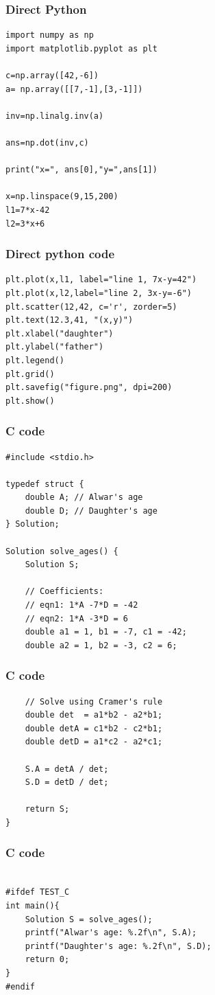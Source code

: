 \documentclass{beamer}
\begin{document}
\begin{frame}[fragile]
\frametitle{Direct Python}
\begin{lstlisting}
import numpy as np
import matplotlib.pyplot as plt

c=np.array([42,-6])
a= np.array([[7,-1],[3,-1]])

inv=np.linalg.inv(a)

ans=np.dot(inv,c)

print("x=", ans[0],"y=",ans[1])

x=np.linspace(9,15,200)
l1=7*x-42
l2=3*x+6
\end{lstlisting}
\end{frame}
\begin{frame}[fragile]
\frametitle{Direct python code}
\begin{lstlisting}
plt.plot(x,l1, label="line 1, 7x-y=42")
plt.plot(x,l2,label="line 2, 3x-y=-6")
plt.scatter(12,42, c='r', zorder=5)
plt.text(12.3,41, "(x,y)")
plt.xlabel("daughter")
plt.ylabel("father")
plt.legend()
plt.grid()
plt.savefig("figure.png", dpi=200)
plt.show()

\end{lstlisting}
\end{frame}
\begin{frame}[fragile]
\frametitle{C code}
\begin{lstlisting}
#include <stdio.h>

typedef struct {
    double A; // Alwar's age
    double D; // Daughter's age
} Solution;

Solution solve_ages() {
    Solution S;

    // Coefficients:
    // eqn1: 1*A -7*D = -42
    // eqn2: 1*A -3*D = 6
    double a1 = 1, b1 = -7, c1 = -42;
    double a2 = 1, b2 = -3, c2 = 6;
\end{lstlisting}
\end{frame}
\begin{frame}[fragile]
\frametitle{C code}
\begin{lstlisting}
    // Solve using Cramer's rule
    double det  = a1*b2 - a2*b1;
    double detA = c1*b2 - c2*b1;
    double detD = a1*c2 - a2*c1;

    S.A = detA / det;
    S.D = detD / det;

    return S;
}\end{lstlisting}
\end{frame}
\begin{frame}[fragile]
\frametitle{C code}
\begin{lstlisting}

#ifdef TEST_C
int main(){
    Solution S = solve_ages();
    printf("Alwar's age: %.2f\n", S.A);
    printf("Daughter's age: %.2f\n", S.D);
    return 0;
}
#endif
\end{lstlisting}
\end{frame}
\end{document}
